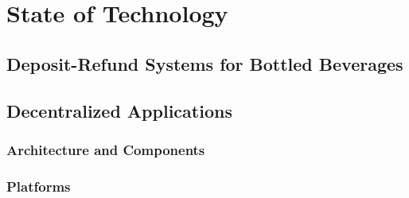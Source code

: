 
\chapter{State of Technology}

\section{Deposit-Refund Systems for Bottled Beverages}


\section{Decentralized Applications}

\subsection{Architecture and Components}
\subsection{Platforms}